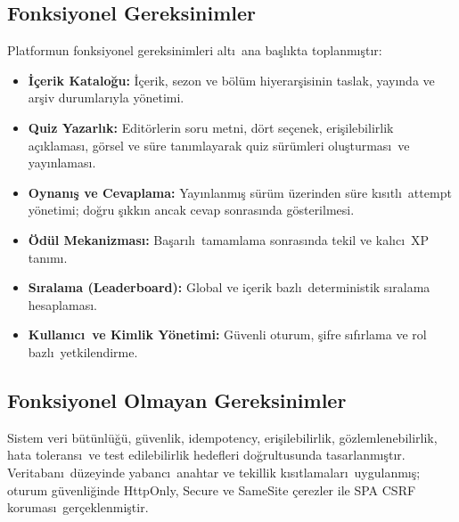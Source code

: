\documentclass[conference,a4paper]{IEEEtran}
\begin{document}
\subsection{Fonksiyonel Gereksinimler}
Platformun fonksiyonel gereksinimleri alt\i\ ana ba\c{s}l\i kta toplanm\i\c{s}t\i r:
\begin{itemize}
    \item \textbf{\.{I}\c{c}erik Katalo\u{g}u:} \.{I}\c{c}erik, sezon ve b\"{o}l\"{u}m hiyerar\c{s}isinin taslak, yay\i nda ve ar\c{s}iv durumlar\i yla y\"{o}netimi.
    \item \textbf{Quiz Yazarl\i k:} Edit\"{o}rlerin soru metni, d\"{o}rt se\c{c}enek, eri\c{s}ilebilirlik a\c{c}\i klamas\i, g\"{o}rsel ve s\"{u}re tan\i mlayarak quiz s\"{u}r\"{u}mleri olu\c{s}turmas\i\ ve yay\i nlamas\i.
    \item \textbf{Oynan\i\c{s} ve Cevaplama:} Yay\i nlanm\i\c{s} s\"{u}r\"{u}m \"{u}zerinden s\"{u}re k\i s\i tl\i\ attempt y\"{o}netimi; do\u{g}ru \c{s}\i kk\i n ancak cevap sonras\i nda g\"{o}sterilmesi.
    \item \textbf{\"{O}d\"{u}l Mekanizmas\i:} Ba\c{s}ar\i l\i\ tamamlama sonras\i nda tekil ve kal\i c\i\ XP tan\i m\i.
    \item \textbf{S\i ralama (Leaderboard):} Global ve i\c{c}erik bazl\i\ deterministik s\i ralama hesaplamas\i.
    \item \textbf{Kullan\i c\i\ ve Kimlik Y\"{o}netimi:} G\"{u}venli oturum, \c{s}ifre s\i f\i rlama ve rol bazl\i\ yetkilendirme.
\end{itemize}

\subsection{Fonksiyonel Olmayan Gereksinimler}
Sistem veri b\"{u}t\"{u}nl\"{u}\u{g}\"{u}, g\"{u}venlik, idempotency, eri\c{s}ilebilirlik, g\"{o}zlemlenebilirlik, hata tolerans\i\ ve test edilebilirlik hedefleri do\u{g}rultusunda tasarlanm\i\c{s}t\i r. Veritaban\i\ d\"{u}zeyinde yabanc\i\ anahtar ve tekillik k\i s\i tlamalar\i\ uygulanm\i\c{s}; oturum g\"{u}venli\u{g}inde HttpOnly, Secure ve SameSite \c{c}erezler ile SPA CSRF korumas\i\ ger\c{c}eklenmi\c{s}tir.
\end{document}
